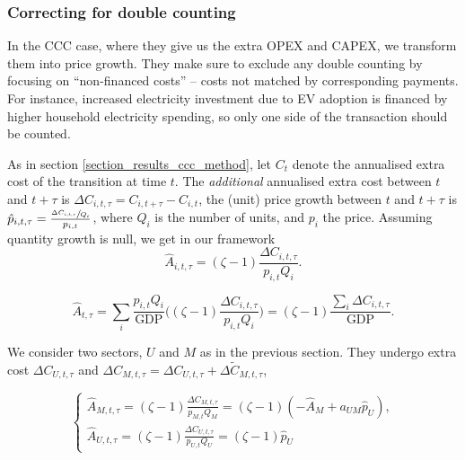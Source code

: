 \documentclass[11pt]{article}
\begin{document}
\subsubsection{Correcting for double counting}

In the CCC case, where they give us the extra OPEX and CAPEX, we transform them into price growth. They make sure to exclude any double counting by focusing on “non-financed costs” -- costs not matched by corresponding payments. For instance, increased electricity investment due to EV adoption is financed by higher household electricity spending, so only one side of the transaction should be counted. 

As in section \ref{section_results_ccc_method}, let $C_t$ denote the annualised extra cost of the transition at time $t$. The \textit{additional} annualised extra cost between $t$ and $t+\tau$ is $\Delta C_{i,t,\tau} = C_{i,t+\tau} - C_{i,t}$, the (unit) price growth between $t$ and $t+\tau$ is $\hat{p}_{i,t,\tau} = \frac{\sfrac{\Delta C_{i,t,\tau}}{Q_i}}{p_{i,t}}$, where $Q_i$ is the number of units, and $p_i$ the price.
Assuming quantity growth is null, we get in our framework 
\begin{equation}
 \hat{A}_{i,t,\tau} = (\zeta - 1) \frac{\Delta C_{i,t,\tau}}{p_{i,t} Q_{i}}.
\end{equation}

\begin{equation}
 \hat{A}_{t,\tau} = \sum_i \frac{p_{i,t} Q_{i}}{\text{GDP}} \Big( (\zeta - 1) \frac{\Delta C_{i,t,\tau}}{p_{i,t} Q_{i}} \Big) = (\zeta - 1)  \frac{\sum_i \Delta C_{i,t,\tau}}{\text{GDP}}.
\end{equation}


We consider two sectors, $U$ and $M$ as in the previous section. They undergo extra cost $\Delta C_{U,t,\tau}$ and $\Delta C_{M,t,\tau}=\Delta C_{U,t,\tau}+\Delta \tilde{C}_{M,t,\tau}$, 

\begin{equation}
\begin{cases}
    \hat{A}_{M,t,\tau} = (\zeta - 1) \frac{\Delta C_{M,t,\tau}}{p_{M,t} Q_{M}}=(\zeta - 1)(-\hat{A}_M+a_{UM}  \hat{p}_U),\\
    \hat{A}_{U,t,\tau}= (\zeta - 1) \frac{\Delta C_{U,t,\tau}}{p_{U,t} Q_{U}}=(\zeta - 1)\hat{p}_U
\end{cases}
\end{equation}
\end{document}
